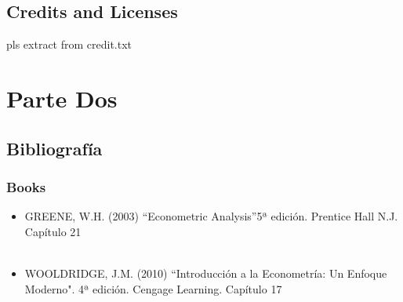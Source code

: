 \documentclass[11pt,fleqn]{book} %
\numberwithin{equation}{section} %
\numberwithin{figure}{section} %
\numberwithin{table}{section} %
\begin{document}
\chapter{Credits and Licenses}
pls extract from credit.txt






\part{Parte Dos}






\chapter*{Bibliografía}
\section*{Books}
\printbibliography[heading=bibempty,type=book]

\begin{itemize}
	\item GREENE, W.H. (2003) “Econometric Analysis”5ª edición. Prentice Hall N.J. Capítulo 21
\\\\
    \item WOOLDRIDGE, J.M. (2010) “Introducción a la Econometría: Un Enfoque Moderno". 4ª edición. Cengage Learning. Capítulo 17

\end{itemize}



\cleardoublepage
{}
\setlength{\columnsep}{0.75cm}
\printindex

\end{document}
